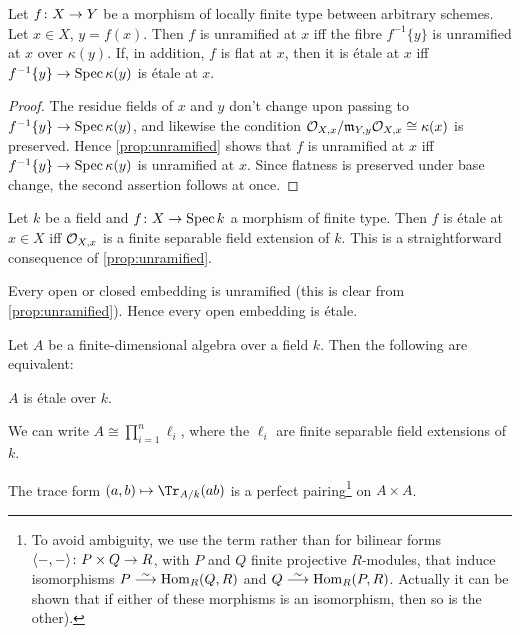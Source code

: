 \begin{fact}\label{fact:etaleFibres}
	Let $f\colon X\morphism Y$ be a morphism of locally finite type between arbitrary schemes. Let $x\in X$, $y=f(x)$. Then $f$ is unramified at $x$ iff the fibre $f^{-1}\{y\}$ is unramified at $x$ over $\kappa(y)$. If, in addition, $f$ is flat at $x$, then it is étale at $x$ iff $f^{-1}\{y\}\morphism\Spec \kappa(y)$ is étale at $x$.
\end{fact}
\begin{proof}
	The residue fields of $x$ and $y$ don't change upon passing to $f^{-1}\{y\}\morphism\Spec\kappa(y)$, and likewise the condition $\mathcal{O}_{X,x}/\mathfrak{m}_{Y,y}\mathcal{O}_{X,x}\cong \kappa(x)$ is preserved. Hence \cref{prop:unramified} shows that $f$ is unramified at $x$ iff $f^{-1}\{y\}\morphism\Spec\kappa(y)$ is unramified at $x$. Since flatness is preserved under base change, the second assertion follows at once.
\end{proof}
\begin{exm}\label{exm:embeddings}
	\begin{alphanumerate}
		\item Let $k$ be a field and $f\colon X\morphism \Spec k$ a morphism of finite type. Then $f$ is étale at $x\in X$ iff $\mathcal{O}_{X,x}$ is a finite separable field extension of $k$. This is a straightforward consequence of \cref{prop:unramified}.
		\item Every open or closed embedding is unramified (this is clear from \cref{prop:unramified}). Hence every open embedding is étale.
	\end{alphanumerate}
\end{exm}
\begin{lem}\label{lem:etaleTrace}
	Let $A$ be a finite-dimensional algebra over a field $k$. Then the following are equivalent:
	\begin{alphanumerate}
		\item $A$ is étale over $k$.
		\item We can write $A\cong \prod_{i=1}^{n}\ell_i$, where the $\ell_i$ are finite separable field extensions of $k$.
		\item The trace form $(a,b)\mapsto \Tr_{A/k}(ab)$ is a perfect pairing\footnote{To avoid ambiguity, we use the term  rather than  for  bilinear forms $\langle -,-\rangle\colon P\times Q\morphism R$, with $P$ and $Q$ finite projective $R$-modules, that induce isomorphisms $P\isomorphism\Hom_R(Q,R)$ and $Q\isomorphism \Hom_R(P,R)$. Actually it can be shown that if either of these morphisms is an isomorphism, then so is the other).} on $A\times A$.
	\end{alphanumerate}
\end{lem}
